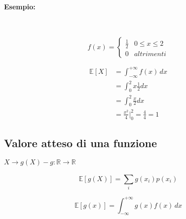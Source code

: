 \documentclass[]{article}
\newcommand{\ev}{\mathbb{E}[X]}
\renewcommand{\ev}[1]{\mathbb{E}[#1]}
\begin{document}
    \paragraph{Esempio:} \hfill \\
    \begin{minipage}{0.45\textwidth}
        \begin{equation*}
            f(x) =
            \begin{cases}
                \frac{1}{2} & 0 \leq x \leq 2 \\
                0 & altrimenti
            \end{cases}
        \end{equation*}
    \end{minipage}
    \hfill
    \begin{minipage}{0.45\textwidth}
        \begin{equation*}
            \begin{split}
                \ev{X} & = \int_{-\infty}^{+\infty} f(x) \, dx \\
                & = \int_{0}^{2} x \frac{1}{2} dx \\
                & = \int_{0}^{2} \frac{x}{2} dx \\
                & = \frac{x^2}{4} \bigg\rvert_{0}^{2} = \frac{4}{4} = 1
            \end{split}
        \end{equation*}
    \end{minipage}


    \subsection{Valore atteso di una funzione}

    \begin{center}
        $ X \rightarrow g(X) - g: \mathbb{R} \rightarrow \mathbb{R} $ \hfill \\
    \end{center}
    

    \begin{minipage}{0.45\textwidth}
        \begin{equation*}
            \ev{g(X)} = \sum_{i}^{} g(x_i) p(x_i)
        \end{equation*}
    \end{minipage}
    \hfill
    \begin{minipage}{0.45\textwidth}
        \begin{equation*}
            \ev{g(x)} = \int_{-\infty}^{+\infty} g(x) f(x) \, dx
        \end{equation*}
    \end{minipage}
\end{document}
